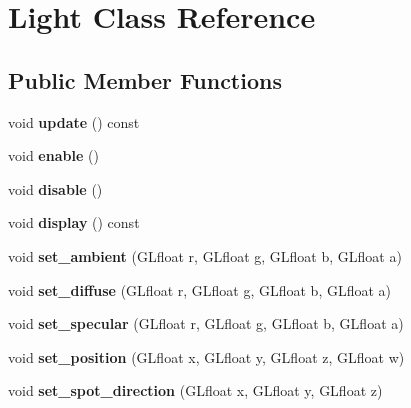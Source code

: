 \hypertarget{class_light}{
\section{Light Class Reference}
\label{class_light}
}
\subsection*{Public Member Functions}
\begin{DoxyCompactItemize}
\item 
\hypertarget{class_light_ad4e3899912418dc33a8b282c467a7b99}{
void {\bfseries update} () const }
\label{class_light_ad4e3899912418dc33a8b282c467a7b99}

\item 
\hypertarget{class_light_a2e8c77656d28ff979c9dbc3b77676304}{
void {\bfseries enable} ()}
\label{class_light_a2e8c77656d28ff979c9dbc3b77676304}

\item 
\hypertarget{class_light_a1a6f283bf8d2f0411081b5ab8a4c680b}{
void {\bfseries disable} ()}
\label{class_light_a1a6f283bf8d2f0411081b5ab8a4c680b}

\item 
\hypertarget{class_light_a19c405fd4c6b15c953b5032e5a2fb5b1}{
void {\bfseries display} () const }
\label{class_light_a19c405fd4c6b15c953b5032e5a2fb5b1}

\item 
\hypertarget{class_light_a9387293486b76874cb3e12cfd918298e}{
void {\bfseries set\_\-ambient} (GLfloat r, GLfloat g, GLfloat b, GLfloat a)}
\label{class_light_a9387293486b76874cb3e12cfd918298e}

\item 
\hypertarget{class_light_a15c2e04768db108dd782f2d477eb7c97}{
void {\bfseries set\_\-diffuse} (GLfloat r, GLfloat g, GLfloat b, GLfloat a)}
\label{class_light_a15c2e04768db108dd782f2d477eb7c97}

\item 
\hypertarget{class_light_aa27b5d794409b5f6e92d5e05994940bd}{
void {\bfseries set\_\-specular} (GLfloat r, GLfloat g, GLfloat b, GLfloat a)}
\label{class_light_aa27b5d794409b5f6e92d5e05994940bd}

\item 
\hypertarget{class_light_abf0a7fd9d355aa265e91287611bf17e2}{
void {\bfseries set\_\-position} (GLfloat x, GLfloat y, GLfloat z, GLfloat w)}
\label{class_light_abf0a7fd9d355aa265e91287611bf17e2}

\item 
\hypertarget{class_light_a627b1e4d1ba86ad93f94a76548bb76ae}{
void {\bfseries set\_\-spot\_\-direction} (GLfloat x, GLfloat y, GLfloat z)}
\label{class_light_a627b1e4d1ba86ad93f94a76548bb76ae}


\end{DoxyCompactItemize}
